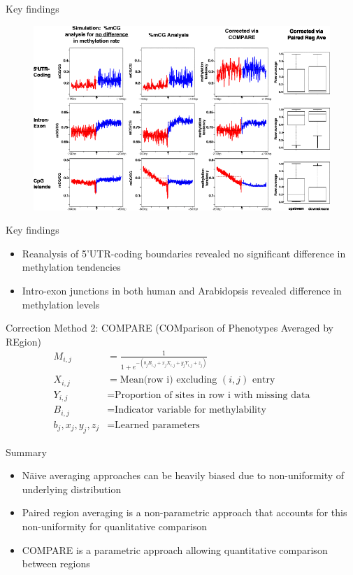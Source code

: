\documentclass[10pt]{beamer}
\begin{document}
\begin{frame}[fragile]{Key findings}
\begin{figure}
\includegraphics[width=\textwidth]{img/fig3}
\end{figure}
\end{frame}

\begin{frame}[fragile]{Key findings}
\begin{itemize}
\item Reanalysis of 5'UTR-coding boundaries revealed no significant difference in methylation tendencies
\item Intro-exon junctions in both human and Arabidopsis revealed difference in methylation levels
\end{itemize}
\end{frame}



\begin{frame}[fragile]{Correction Method 2: COMPARE (COMparison of
Phenotypes Averaged by REgion)}
\begin{align*}
M_{i,j} &= \frac{1}{1+e^{-(b_jB_{i,j}+x_jX_{i,j}+y_jY_{i,j}+z_j)}}\\
X_{i,j} &= \text{Mean(row i) excluding $(i,j)$ entry}\\
Y_{i,j} &= \text{Proportion of sites in row i with missing data}\\
B_{i,j} &= \text{Indicator variable for methylability}\\
b_j, x_j, y_j, z_j &= \text{Learned parameters}
\end{align*}
\end{frame}


\begin{frame}[fragile]{Summary}
\begin{itemize}
\item N\"{a}ive averaging approaches can be heavily biased due to non-uniformity of underlying distribution
\item Paired region averaging is a non-parametric approach that accounts for this non-uniformity for quanlitative comparison
\item COMPARE is a parametric approach allowing quantitative comparison between regions
\end{itemize}
\end{frame}
\end{document}
